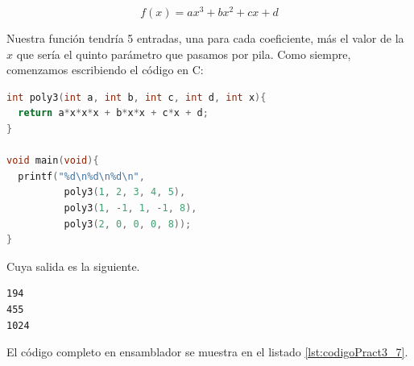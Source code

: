 \begin{equation}
f(x) = ax^3 + bx^2 + cx + d
\label{eq:polinomio}
\end{equation}


Nuestra función tendría 5 entradas, una para cada coeficiente, más el valor de la $x$ que
sería el quinto parámetro que pasamos por pila. Como siempre, comenzamos escribiendo el código en C:

\begin{lstlisting}[caption={Evaluador de polinomios subrut5.c},label={lst:codigoPract3_6},language=C]
int poly3(int a, int b, int c, int d, int x){
  return a*x*x*x + b*x*x + c*x + d;
}

void main(void){
  printf("%d\n%d\n%d\n",
          poly3(1, 2, 3, 4, 5), 
          poly3(1, -1, 1, -1, 8), 
          poly3(2, 0, 0, 0, 8));
}
\end{lstlisting}

Cuya salida es la siguiente.

\begin{lstlisting}
194
455
1024
\end{lstlisting}

El código completo en ensamblador se muestra en el listado \ref{lst:codigoPract3_7}.

